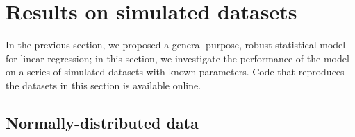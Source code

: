 \documentclass[fleqn,usenatbib]{mnras}
\begin{document}









\section{Results on simulated datasets}
\label{sec:results}

In the previous section, we proposed a general-purpose, robust statistical model
for linear regression; in this section, we investigate the performance of the
model on a series of simulated datasets with known parameters. Code that
reproduces the datasets in this section is available online\footnotemark.




\subsection{Normally-distributed data}
\end{document}
